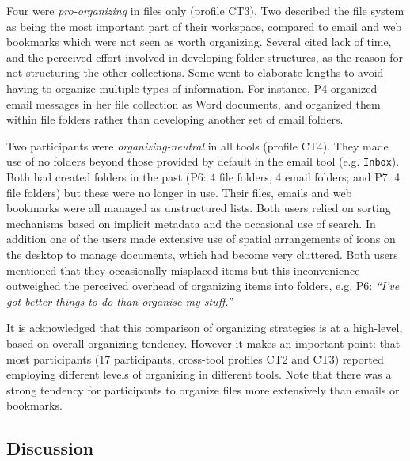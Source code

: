 Four were \textit{pro-organizing} in files only (profile CT3).
Two described the file system as being the most important part of their workspace, compared to email and web bookmarks which were not seen as worth organizing.  Several cited lack of time, and the perceived effort involved in developing folder structures, as the reason for not structuring the other collections. Some went to elaborate lengths to avoid having to organize multiple types of information. For instance, P4 organized email messages in her file collection as Word documents, and organized them within file folders rather than developing another set of email folders.

Two participants were \textit{organizing-neutral} in all tools (profile CT4). They made use of no folders beyond those provided by default in the email tool (e.g. \texttt{Inbox}). Both had created folders in the past (P6: 4 file folders, 4 email folders; and P7: 4 file folders) but these were no longer in use. Their files, emails and web bookmarks were all managed as unstructured lists. Both users relied on sorting mechanisms based on implicit metadata and the occasional use of search. In addition one of the users made extensive use of spatial arrangements of icons on the desktop to manage documents, which had become very cluttered. Both users mentioned that they occasionally misplaced items but this inconvenience outweighed the perceived overhead of organizing items into folders, e.g. P6: \textit{``I've got better things to do than organise my stuff.''}

It is acknowledged that this comparison of organizing strategies is at a high-level, based on overall organizing tendency. However it makes an important point: that most participants (17 participants, cross-tool profiles CT2 and CT3) reported employing different levels of organizing in different tools. Note that there was a strong tendency for participants to organize files more extensively than emails or bookmarks.

\subsection{Discussion}
\label{exp-study:Results-cross-tool-profiling-discussion}

